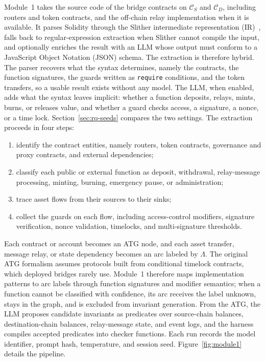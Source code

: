 \documentclass[a4paper]{cas-sc}
\begin{document}
Module~1 takes the source code of the bridge contracts on $\mathcal{C}_S$ and $\mathcal{C}_D$, including routers and token contracts, and the off-chain relay implementation when it is available. It parses Solidity through the Slither intermediate representation (IR)~\citep{feist2019slither}, falls back to regular-expression extraction when Slither cannot compile the input, and optionally enriches the result with an LLM whose output must conform to a JavaScript Object Notation (JSON) schema. The extraction is therefore hybrid. The parser recovers what the syntax determines, namely the contracts, the function signatures, the guards written as \texttt{require} conditions, and the token transfers, so a usable result exists without any model. The LLM, when enabled, adds what the syntax leaves implicit: whether a function deposits, relays, mints, burns, or releases value, and whether a guard checks access, a signature, a nonce, or a time lock. Section~\ref{sec:rq-seeds} compares the two settings. The extraction proceeds in four steps:
\begin{enumerate}
    \item identify the contract entities, namely routers, token contracts, governance and proxy contracts, and external dependencies;
    \item classify each public or external function as deposit, withdrawal, relay-message processing, minting, burning, emergency pause, or administration;
    \item trace asset flows from their sources to their sinks;
    \item collect the guards on each flow, including access-control modifiers, signature verification, nonce validation, timelocks, and multi-signature thresholds.
\end{enumerate}

Each contract or account becomes an ATG node, and each asset transfer, message relay, or state dependency becomes an arc labeled by $\Lambda$. The original ATG formalism assumes protocols built from conditional timelock contracts, which deployed bridges rarely use. Module~1 therefore maps implementation patterns to arc labels through function signatures and modifier semantics; when a function cannot be classified with confidence, its arc receives the label unknown, stays in the graph, and is excluded from invariant generation. From the ATG, the LLM proposes candidate invariants as predicates over source-chain balances, destination-chain balances, relay-message state, and event logs, and the harness compiles accepted predicates into checker functions. Each run records the model identifier, prompt hash, temperature, and session seed. Figure~\ref{fig:module1} details the pipeline.
\end{document}
